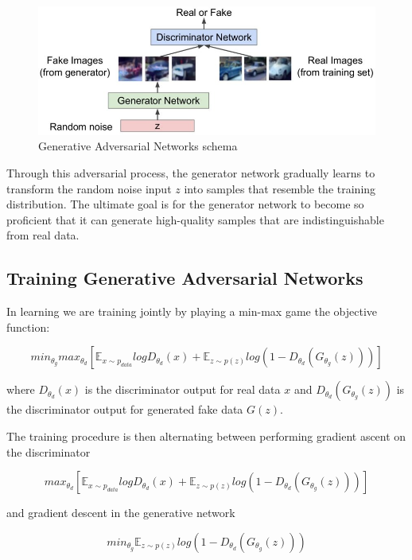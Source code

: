 \begin{figure}[h]
    \centering
    \includegraphics[width=12cm]{Images/gans.jpg}
    \caption{Generative Adversarial Networks schema}
    \label{fig:gans}
\end{figure}

\noindent Through this adversarial process, the generator network gradually learns to transform the random noise input $z$ into samples that resemble the training distribution. The ultimate goal is for the generator network to become so proficient that it can generate high-quality samples that are indistinguishable from real data.

\subsection{Training Generative Adversarial Networks}

In learning we are training jointly by playing a min-max game the objective function:

$$ min_{\theta_g} max_{\theta_d} \left[ \mathbb{E}_{x \sim p_{data}} log D_{\theta_d} (x) + \mathbb{E}_{z \sim p(z)} log \left( 1 - D_{\theta_d} \left( G_{\theta_g} (z)  \right)     \right)    \right] $$

where $D_{\theta_d} (x)$ is the discriminator output for real data $x$ and $D_{\theta_d} \left( G_{\theta_g} (z)  \right)$ is the discriminator output for generated fake data $G(z)$.

\noindent The training procedure is then alternating between performing gradient ascent on the discriminator

$$ max_{\theta_d} \left[ \mathbb{E}_{x \sim p_{data}} log D_{\theta_d} (x) + \mathbb{E}_{z \sim p(z)} log \left( 1 - D_{\theta_d} \left( G_{\theta_g} (z)  \right)     \right)    \right] $$

\noindent and gradient descent in the generative network

$$ min_{\theta_g} \mathbb{E}_{z \sim p(z)} log \left( 1 - D_{\theta_d} \left( G_{\theta_g} (z)  \right)     \right) $$

